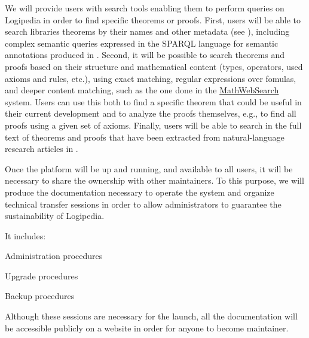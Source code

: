 \begin{workpackage}[id=access,wphases=0-48,type=MGT,
  short=Access,%
  title={Access to the infrastructure},
  lead=Inr,
  InrRM=28,%
  OcaRM=6]
\begin{tasklist}
  \begin{task}[id=search,
      title=Providing search tools,
      lead=Inr,InrRM=18]
    We will provide users with search tools enabling them to perform
    queries on Logipedia in order to find specific theorems or proofs.
    First, users will be able to search libraries theorems by their
    names and other metadata (see ),
    including complex semantic queries expressed in the SPARQL
    language for semantic annotations produced in
    . Second, it will be possible to
    search theorems and proofs based on their structure and
    mathematical content (types, operators, used axioms and rules,
    etc.), using exact matching, regular expressions over fomulas, and
    deeper content matching, such as the one done in the
    \hyperlink{https://kwarc.info/systems/mws/}{MathWebSearch}
    system. Users can use this both to find a specific theorem that
    could be useful in their current development and to analyze the
    proofs themselves, e.g., to find all proofs using a given set of
    axioms.  Finally, users will be able to search in the full text of
    theorems and proofs that have been extracted from natural-language
    research articles in .
  \end{task}

  \begin{task}[id=transfer,
      title=Transfer for the sustainability of the system,
      lead=Irt,IrtRM=1]
    Once the platform will be up and running, and available to all
    users, it will be necessary to share the ownership with other
    maintainers. To this purpose, we will produce the documentation
    necessary to operate the system and organize technical transfer
    sessions in order to allow administrators to guarantee the
    sustainability of Logipedia.

    It includes:
    \begin{compactitem}
    \item Administration procedures
    \item Upgrade procedures
    \item Backup procedures
    \end{compactitem}

    Although these sessions are necessary for the launch, all the
    documentation will be accessible publicly on a website in order
    for anyone to become maintainer.
  \end{task}


\end{tasklist}
\end{workpackage}
